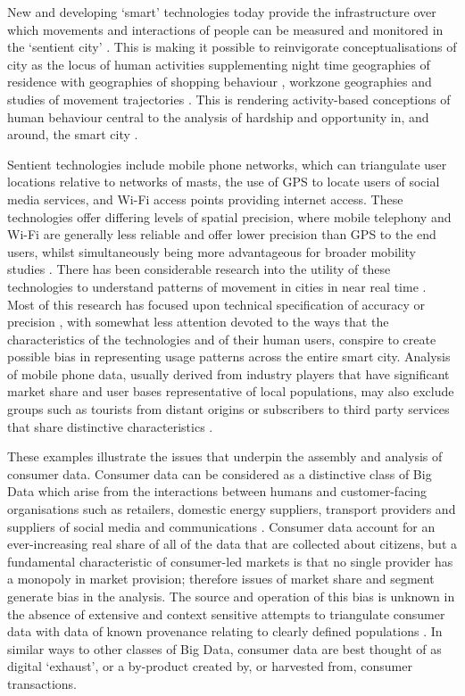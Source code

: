 New and developing ‘smart’ technologies today provide the infrastructure over
which movements and interactions of people can be measured and monitored in the
‘sentient city’ \citep{amin2017seeing}. This is making it possible to
reinvigorate conceptualisations of city as the locus of human activities
supplementing night time geographies of residence \citep{martin2015developing}
with geographies of shopping behaviour \citep{lloyd2018detecting}, workzone
geographies \citep{singleton2018london} and studies of movement trajectories
\citep{campbell2008transforming}. This is rendering activity-based conceptions
of human behaviour central to the analysis of hardship and opportunity in, and
around, the smart city \citep{venerandi2015measuring}.

Sentient technologies include mobile phone networks, which can triangulate user
locations relative to networks of masts, the use of GPS to locate users of
social media services, and Wi-Fi access points providing internet access. These
technologies offer differing levels of spatial precision, where mobile
telephony and Wi-Fi are generally less reliable and offer lower precision than
GPS to the end users, whilst simultaneously being more advantageous for broader
mobility studies \citep{pinelli2015comparing}. There has been considerable
research into the utility of these technologies to understand patterns of
movement in cities in near real time \citep{candia2008uncovering,
gonzalez2008understanding, calabrese2013understanding}. Most of this research
has focused upon technical specification of accuracy or precision
\citep{song2010limits,lane2010survey}, with somewhat less attention devoted to
the ways that the characteristics of the technologies and of their human users,
conspire to create possible bias in representing usage patterns across the
entire smart city. Analysis of mobile phone data, usually derived from industry
players that have significant market share and user bases representative of
local populations, may also exclude groups such as tourists from distant
origins or subscribers to third party services that share distinctive
characteristics \citep{di2016mind}.

These examples illustrate the issues that underpin the assembly and analysis of
consumer data. Consumer data can be considered as a distinctive class of Big
Data which arise from the interactions between humans and customer-facing
organisations such as retailers, domestic energy suppliers, transport providers
and suppliers of social media and communications \citep{cdrc2018consumer}.
Consumer data account for an ever-increasing real share of all of the data that
are collected about citizens, but a fundamental characteristic of consumer-led
markets is that no single provider has a monopoly in market provision;
therefore issues of market share and segment generate bias in the analysis. The
source and operation of this bias is unknown in the absence of extensive and
context sensitive attempts to triangulate consumer data with data of known
provenance relating to clearly defined populations \citep{lansley2016deriving}.
In similar ways to other classes of Big Data, consumer data are best thought of
as digital ‘exhaust’, or a by-product created by, or harvested from, consumer
transactions.

